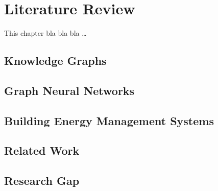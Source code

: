 \chapter{Literature Review}\label{chap:literature-review}
This chapter bla bla bla \ldots
\section{Knowledge Graphs}\label{sec:knowledge-graphs}

%
\section{Graph Neural Networks}\label{sec:graph-neural-networks}

%
\section{Building Energy Management Systems}\label{sec:building-energy-management-systems}

%
\section{Related Work}\label{sec:related-work}

%
\section{Research Gap}\label{sec:research-gap}

